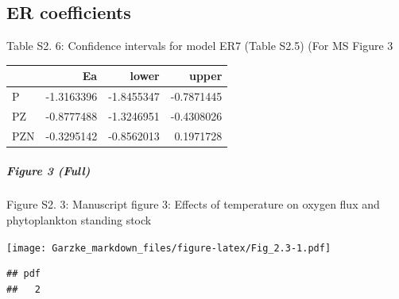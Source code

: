 \documentclass[]{article}
\let\oldsubparagraph\subparagraph
\renewcommand{\subparagraph}[1]{\oldsubparagraph{#1}\mbox{}}
\begin{document}
\subsection{ER coefficients}\label{er-coefficients}

Table S2. 6: Confidence intervals for model ER7 (Table S2.5) (For MS
Figure 3

\begin{longtable}[]{@{}lrrr@{}}
\toprule
& Ea & lower & upper\tabularnewline
\midrule
\endhead
P & -1.3163396 & -1.8455347 & -0.7871445\tabularnewline
PZ & -0.8777488 & -1.3246951 & -0.4308026\tabularnewline
PZN & -0.3295142 & -0.8562013 & 0.1971728\tabularnewline
\bottomrule
\end{longtable}

\subparagraph{Figure 3 (Full)}\label{figure-3-full}

Figure S2. 3: Manuscript figure 3: Effects of temperature on oxygen flux
and phytoplankton standing stock

\texttt{[image: Garzke\_markdown\_files/figure-latex/Fig\_2.3-1.pdf]}

\begin{verbatim}
## pdf 
##   2
\end{verbatim}
\end{document}
